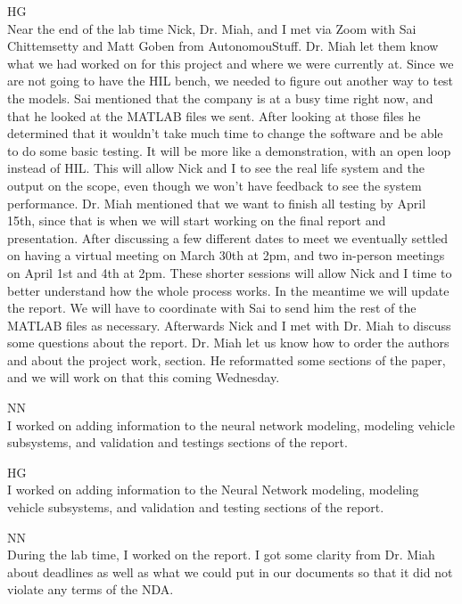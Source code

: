 \documentclass[fontsize=11pt, %
                             paper=letter, %
                             openany, %
                             captions=tableheading,
                             index=totoc,
                             hyperref]{labbook}
\def\currentYear{2021}
\begin{document}
\begin{addmargin}[0cm]{0cm}
HG\\ Near the end of the lab time Nick, Dr. Miah, and I met via Zoom with Sai Chittemsetty and Matt Goben from AutonomouStuff. Dr. Miah let them know what we had worked on for this project and where we were currently at. Since we are not going to have the HIL bench, we needed to figure out another way to test the models. Sai mentioned that the company is at a busy time right now, and that he looked at the MATLAB files we sent. After looking at those files he determined that it wouldn't take much time to change the software and be able to do some basic testing. It will be more like a demonstration, with an open loop instead of HIL. This will allow Nick and I to see the real life system and the output on the scope, even though we won't have feedback to see the system performance. Dr. Miah mentioned that we want to finish all testing by April 15th, since that is when we will start working on the final report and presentation. After discussing a few different dates to meet we eventually settled on having a virtual meeting on March 30th at 2pm, and two in-person meetings on April 1st and 4th at 2pm. These shorter sessions will allow Nick and I time to better understand how the whole process works. In the meantime we will update the report. We will have to coordinate with Sai to send him the rest of the MATLAB files as necessary. 
\linebreak
Afterwards Nick and I met with Dr. Miah to discuss some questions about the report. Dr. Miah let us know how to order the authors and about the project work,  section. He reformatted some sections of the paper, and we will work on that this coming Wednesday. 

\labday{Wednesday, March 23, \currentYear}
NN\\
I worked on adding information to the neural network modeling, modeling vehicle subsystems, and validation and testings sections of the report.

HG\\
I worked on adding information to the Neural Network modeling, modeling vehicle subsystems, and validation and testing sections of the report. 

\labday{Monday, March 28, \currentYear}
NN\\
During the lab time, I worked on the report. I got some clarity from Dr. Miah about deadlines as well as what we could put in our documents so that it did not violate any terms of the NDA. 


\end{addmargin}
\end{document}

